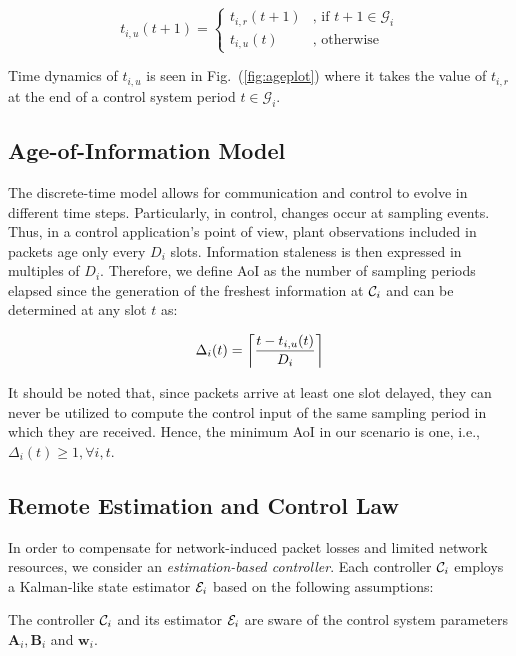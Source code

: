 \begin{equation}
  \label{eq:t_u}
  t_{i, u}(t+1) =
  \begin{cases}
  t_{i, r}(t+1) & \text{, if } t+1 \in \mathcal{G}_i \\ 
  t_{i, u}(t) & \text{, otherwise}	
  \end{cases} 
\end{equation}

Time dynamics of $t_{i,u}$ is seen in Fig.~(\ref{fig:ageplot}) where it takes
the value of $t_{i,r}$ at the end of a control system period $t \in
\mathcal{G}_i$.

\subsection{Age-of-Information Model}
The discrete-time model allows for communication and control to evolve in
different time steps. Particularly, in control, changes occur at sampling
events. Thus, in a control application's point of view, plant observations
included in packets age only every $D_i$ slots. Information staleness is then
expressed in multiples of $D_i$. Therefore, we define AoI as the number of
sampling periods elapsed since the generation of the freshest information at
$\mathcal{C}_i$ and can be determined at any slot $t$ as:

\begin{equation}
  \label{eq:aoi}
  \Delta_i(t) = \left\lceil \dfrac{t - t_{i,u}(t)}{D_{i}} \right\rceil 
\end{equation}

It should be noted that, since packets arrive at least one slot delayed, they
can never be utilized to compute the control input of the same sampling period
in which they are received. Hence, the minimum AoI in our scenario is one, i.e.,
$\Delta_i(t) \ge 1,\forall i,t$.

\subsection{Remote Estimation and Control Law}
In order to compensate for network-induced packet losses and limited network
resources, we consider an \textit{estimation-based controller}. Each controller
$\mathcal{C}_i$ employs a Kalman-like state estimator $\mathcal{E}_i$ based on the
following assumptions:

\begin{theorem}
  The controller $\mathcal{C}_i$ and its estimator $\mathcal{E}_i$ are sware of the
  control system parameters $\boldsymbol{A}_i, \boldsymbol{B}_i$ and
  $\boldsymbol{w}_i$.
\end{theorem}

